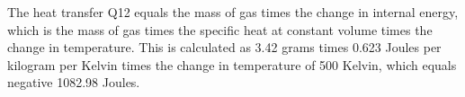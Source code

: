 The heat transfer Q12 equals the mass of gas times the change in internal energy, which is the mass of gas times the specific heat at constant volume times the change in temperature. This is calculated as 3.42 grams times 0.623 Joules per kilogram per Kelvin times the change in temperature of 500 Kelvin, which equals negative 1082.98 Joules.